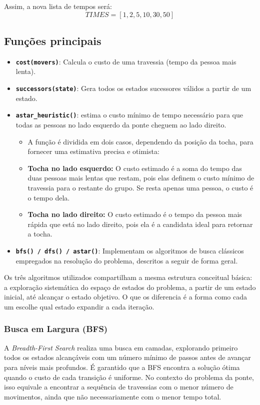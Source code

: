 \documentclass[12pt,a4paper]{article}
\begin{document}
Assim, a nova lista de tempos será:
\[
TIMES = [1, 2, 5, 10, 30, 50]
\]

\subsection{Funções principais}
\begin{itemize}
    \item \textbf{\texttt{cost(movers)}}: Calcula o custo de uma travessia (tempo da pessoa mais lenta).
    \item \textbf{\texttt{successors(state)}}: Gera todos os estados sucessores válidos a partir de um estado.
    \item \textbf{\texttt{astar\_heuristic()}}: estima o custo mínimo de tempo necessário para que todas as pessoas no lado esquerdo da ponte cheguem ao lado direito.
    \begin{itemize}
        \item A função é dividida em dois casos, dependendo da posição da tocha, para fornecer uma estimativa precisa e otimista:
        \item \textbf{Tocha no lado esquerdo:} O custo estimado é a soma do tempo das duas pessoas mais lentas que restam, pois elas definem o custo mínimo de travessia para o restante do grupo. Se resta apenas uma pessoa, o custo é o tempo dela.
        \item \textbf{Tocha no lado direito:} O custo estimado é o tempo da pessoa mais rápida que está no lado direito, pois ela é a candidata ideal para retornar a tocha.
    \end{itemize}
    \item \textbf{\texttt{bfs() / dfs() / astar()}}: Implementam os algoritmos de busca clássicos empregados na resolução do problema, descritos a seguir de forma geral.
\end{itemize}

Os três algoritmos utilizados compartilham a mesma estrutura conceitual básica: a exploração sistemática do espaço de estados do problema, a partir de um estado inicial, até alcançar o estado objetivo. O que os diferencia é a forma como cada um escolhe qual estado expandir a cada iteração.

\subsubsection{Busca em Largura (BFS)} 
A \textit{Breadth-First Search} realiza uma busca em camadas, explorando primeiro todos os estados alcançáveis com um número mínimo de passos antes de avançar para níveis mais profundos. 
É garantido que a BFS encontra a solução ótima quando o custo de cada transição é uniforme. No contexto do problema da ponte, isso equivale a encontrar a sequência de travessias com o menor número de movimentos, ainda que não necessariamente com o menor tempo total.
\end{document}

